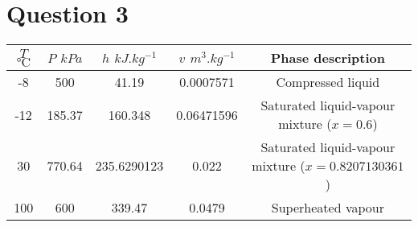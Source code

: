 \documentclass[11pt]{article}
\begin{document}
\section{Question 3}
\label{sec:org404e4fc}
\begin{center}
\begin{tabular}{|c|c|c|c|c|}
\hline
\(T\) \(\unit{\degreeCelsius}\) & \(P\) \(\unit{kPa}\) & \(h\) \(\unit{kJ.kg^{-1}}\) & \(v\) \(\unit{m^3.kg^{-1}}\) & Phase description\\[0pt]
\hline
-8 & 500 & 41.19 & 0.0007571 & Compressed liquid\\[0pt]
-12 & 185.37 & 160.348 & 0.06471596 & Saturated liquid-vapour mixture (\(x = 0.6\))\\[0pt]
30 & 770.64 & 235.6290123 & 0.022 & Saturated liquid-vapour mixture (\(x = 0.8207130361\))\\[0pt]
100 & 600 & 339.47 & 0.0479 & Superheated vapour\\[0pt]
\hline
\end{tabular}
\end{center}
\end{document}
